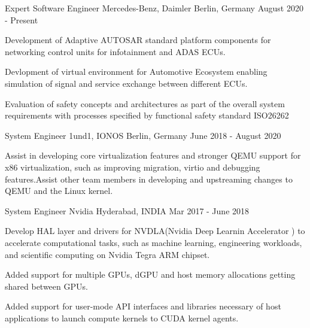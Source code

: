 
\begin{cventries}
  \cventry
    {Expert Software Engineer}
    {Mercedes-Benz, Daimler}
    {Berlin, Germany}
    {August 2020 - Present}
    {
      \begin{cvitems}
        \item {Development of Adaptive AUTOSAR standard platform components for networking control units for infotainment and ADAS ECUs.}
        \item {Devlopment of virtual environment for Automotive Ecosystem enabling simulation of signal and service exchange between different ECUs.}
        \item {Evaluation of safety concepts and architectures as part of the overall system requirements with processes specified by functional safety standard ISO26262}
      \end{cvitems}
    }	

  \cventry
    {System Engineer}
    {1und1, IONOS}
    {Berlin, Germany}
    {June 2018 - August 2020}
    {
      \begin{cvitems}
        \item {Assist in developing core virtualization features and stronger QEMU support for x86 virtualization, such as improving migration, virtio and debugging features.Assist other team members in developing and upstreaming changes to QEMU and the Linux kernel.}
      \end{cvitems}
    }	

  \cventry
    {System Engineer}
    {Nvidia}
    {Hyderabad, INDIA}
    {Mar 2017 - June 2018 }
    {
      \begin{cvitems}
        \item {Develop HAL layer and drivers for NVDLA(Nvidia Deep Learnin Accelerator ) to accelerate computational tasks, such as machine learning, engineering workloads, and scientific computing on Nvidia Tegra ARM chipset.}
        \item {Added support for multiple GPUs, dGPU and host memory allocations getting shared between GPUs.}
        \item {Added support for user-mode API interfaces and libraries necessary of host applications to launch compute kernels to CUDA kernel agents.}
      \end{cvitems}
    }	
    

\end{cventries}
